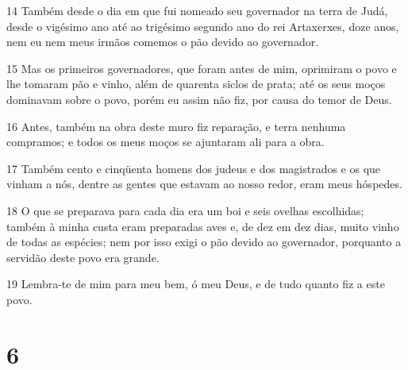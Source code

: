 \par 14 Também desde o dia em que fui nomeado seu governador na terra de Judá, desde o vigésimo ano até ao trigésimo segundo ano do rei Artaxerxes, doze anos, nem eu nem meus irmãos comemos o pão devido ao governador.
\par 15 Mas os primeiros governadores, que foram antes de mim, oprimiram o povo e lhe tomaram pão e vinho, além de quarenta siclos de prata; até os seus moços dominavam sobre o povo, porém eu assim não fiz, por causa do temor de Deus.
\par 16 Antes, também na obra deste muro fiz reparação, e terra nenhuma compramos; e todos os meus moços se ajuntaram ali para a obra.
\par 17 Também cento e cinqüenta homens dos judeus e dos magistrados e os que vinham a nós, dentre as gentes que estavam ao nosso redor, eram meus hóspedes.
\par 18 O que se preparava para cada dia era um boi e seis ovelhas escolhidas; também à minha custa eram preparadas aves e, de dez em dez dias, muito vinho de todas as espécies; nem por isso exigi o pão devido ao governador, porquanto a servidão deste povo era grande.
\par 19 Lembra-te de mim para meu bem, ó meu Deus, e de tudo quanto fiz a este povo.

\chapter{6}


